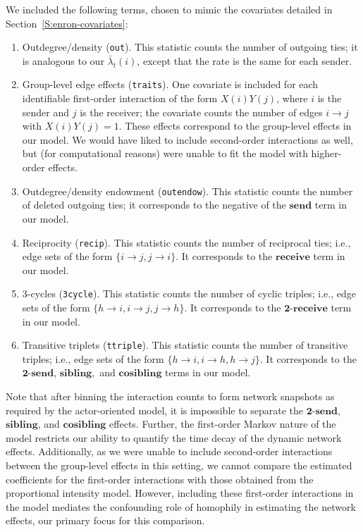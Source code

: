 \documentclass[final]{statsoc}
\begin{document}
We included the following terms, chosen to mimic the covariates detailed in Section~\ref{S:enron-covariates}:

\begin{enumerate}
  \item Outdegree/density (\texttt{out}). This statistic counts the number
of outgoing ties; it is analogous to our $\bar \lambda_t(i)$, except that
the rate is the same for each sender.

  \item Group-level edge effects (\texttt{traits}).  One covariate is included for each
identifiable first-order interaction of the form $X(i) Y(j)$, where $i$ is the
sender and $j$ is the receiver; the covariate counts the number of edges $i
\to j$ with $X(i) Y(j) = 1$.  These effects correspond to the group-level
effects in our model.  We would have liked to include second-order
interactions as well, but (for computational reasons) were unable to fit the model with higher-order
effects.

  \item Outdegree/density endowment (\texttt{outendow}).  This statistic counts the number of deleted outgoing ties; it corresponds to the
negative of the $\textbf{send}$ term in our model.

  \item Reciprocity (\texttt{recip}).  This statistic counts the number of
    reciprocal ties; i.e., edge sets of the form $\{ i \to j, j \to i \}$.  It
corresponds to the $\textbf{receive}$ term in our model.

  \item 3-cycles (\texttt{3cycle}).  This statistic counts the number of cyclic
triples; i.e., edge sets of the form $\{ h \to i, i \to j, j \to h\}$.  It
corresponds to the $\textbf{2-receive}$ term in our model.

  \item Transitive triplets (\texttt{ttriple}).  This statistic counts the
number of transitive triples; i.e., edge sets of the form $\{ h \to i, i \to h, h
\to j \}$.  It corresponds to the $\textbf{2-send}$, $\textbf{sibling},$
and $\textbf{cosibling}$ terms in our model.

\end{enumerate}

\noindent
Note that after binning the interaction counts to form network snapshots as
required by the actor-oriented model, it is impossible to separate the
$\textbf{2-send}$, $\textbf{sibling}$, and $\textbf{cosibling}$ effects.
Further, the first-order Markov nature of the model restricts
our ability to quantify the time decay of the dynamic network effects.  Additionally, as we were unable to include second-order interactions
between the group-level effects in this setting, we cannot compare the estimated coefficients
for the first-order interactions with those obtained from the proportional
intensity model.  However, including these first-order interactions in the model mediates the confounding
role of homophily in estimating the network effects, our primary focus for
this comparison.
\end{document}
